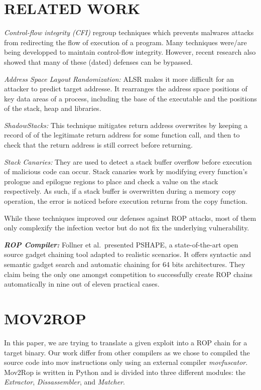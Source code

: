\documentclass[10pt,twocolumn]{article}
\begin{document}
\section{RELATED WORK}

\textit{Control-flow integrity (CFI)\cite{mulder_subject_2016}} regroup techniques which prevents malwares
attacks from redirecting the flow of execution of a program. Many techniques
were/are being developped to maintain control-flow integrity. However, recent
research also showed that many of these (dated) defenses can be bypassed.

\textit{Address Space Layout Randomization:} ALSR makes it more difficult for
an attacker to predict target addresse. It rearranges the address space
positions of key data areas of a process, including the base of the executable
and the positions of the stack, heap and libraries.

\textit{ShadowStacks\cite{Sinnadurai_transparentruntime}:} This technique
mitigates return address overwrites by keeping a record of of the legitimate
return address for some function call, and then to check that the return
address is still correct before returning.

\textit{Stack Canaries:} They are used to detect a stack buffer overflow before
execution of malicious code can occur. Stack canaries work by modifying every
function's prologue and epilogue regions to place and check a value on the
stack respectively. As such, if a stack buffer is overwritten during a memory
copy operation, the error is noticed before execution returns from the copy
function.

While these techniques improved our defenses against ROP attacks, most of them only
 complexify the infection vector but do not fix the underlying vulnerability.

\textbf{\textit{ROP Compiler:}} Follner et al.\ presented
PSHAPE\cite{barthe_pshape:_2016}, a state-of-the-art open source gadget
chaining tool adapted to realistic scenarios. It offers syntactic and semantic
gadget search and automatic chaining for 64 bits architectures.  They claim
being the only one amongst competition to successfully create ROP chains
automatically in nine out of eleven practical cases.


\section{MOV2ROP}

In this paper, we are trying to translate a given exploit into a ROP chain for
a target binary. Our work differ from other compilers as we chose to compiled
the source code into mov instructions only using an external compiler
\textit{movfuscator}. Mov2Rop is written in Python and is divided into three
different modules: the \textit{Extractor}, \textit{Dissassembler}, and
\textit{Matcher}.
\end{document}
